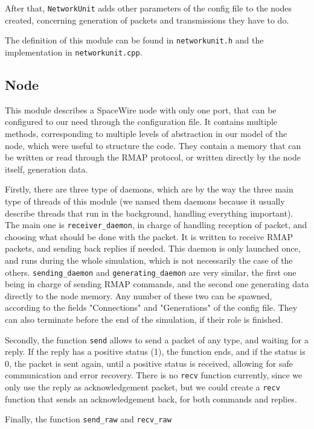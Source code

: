 \documentclass[12pt,a4paper]{article}
\begin{document}
After that, \texttt{NetworkUnit} adds other parameters of the config file to the nodes created, concerning generation of packets and transmissions they have to do.

The definition of this module can be found in \texttt{networkunit.h} and the implementation in \texttt{networkunit.cpp}.

\subsection{Node}
This module describes a SpaceWire node with only one port, that can be configured to our need through the configuration file. It contains multiple methods, corresponding to multiple levels of abstraction in our model of the node, which were useful to structure the code. They contain a memory that can be written or read through the RMAP protocol, or written directly by the node itself, generation data.

Firstly, there are three type of daemons, which are by the way the three main type of threads of this module (we named them daemons because it usually describe threads that run in the background, handling everything important). The main one is \texttt{receiver_daemon}, in charge of handling reception of packet, and choosing what should be done with the packet. It is written to receive RMAP packets, and sending back replies if needed. This daemon is only launched once, and runs during the whole simulation, which is not necessarily the case of the others. \texttt{sending_daemon} and \texttt{generating_daemon} are very similar, the first one being in charge of sending RMAP commands, and the second one generating data directly to the node memory. Any number of these two can be spawned, according to the fields "Connections" and "Generations" of the config file. They can also terminate before the end of the simulation, if their role is finished.

Secondly, the function \texttt{send} allows to send a packet of any type, and waiting for a reply. If the reply has a positive status (1), the function ends, and if the status is 0, the packet is sent again, until a positive status is received, allowing for safe communication and error recovery. There is no \texttt{recv} function currently, since we only use the reply as acknowledgement packet, but we could create a \texttt{recv} function that sends an acknowledgement back, for both commands and replies.

Finally, the function \texttt{send_raw} and \texttt{recv_raw}
\end{document}
